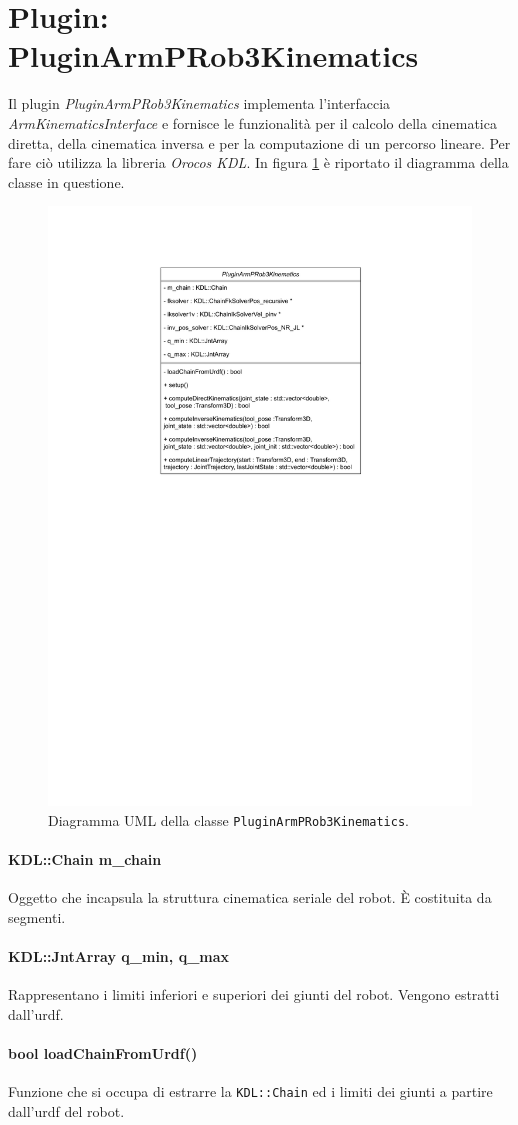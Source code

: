 \section{Plugin: PluginArmPRob3Kinematics}
Il plugin \textit{PluginArmPRob3Kinematics} implementa l'interfaccia \textit{ArmKinematicsInterface} e fornisce le funzionalità per il calcolo della cinematica diretta, della cinematica inversa e per la computazione di un percorso lineare. Per fare ciò utilizza la libreria \textit{Orocos KDL}. 
In figura \ref{fig:plugin_uml} è riportato il diagramma della classe in questione.

\begin{figure}[ht!]
	\centering
	\includegraphics[width=0.5\linewidth]{./ImageFiles/PluginArmPRob3Kinematics.drawio.pdf}
	\caption{Diagramma UML della classe \texttt{PluginArmPRob3Kinematics}.}
	\label{fig:plugin_uml}
\end{figure}

\paragraph{KDL::Chain m\_chain}
Oggetto che incapsula la struttura cinematica seriale del robot. È costituita da segmenti.

\paragraph{KDL::JntArray q\_min, q\_max}
Rappresentano i limiti inferiori e superiori dei giunti del robot. Vengono estratti dall'urdf.

\paragraph{bool loadChainFromUrdf()}
Funzione che si occupa di estrarre la \texttt{KDL::Chain} ed i limiti dei giunti a partire dall'urdf del robot.


